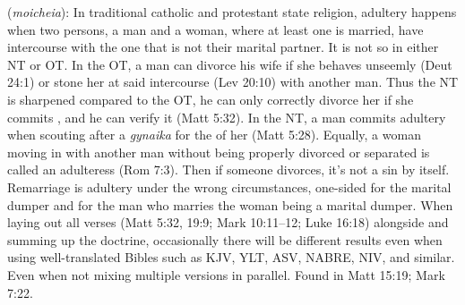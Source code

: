 \item[Adultery,]

(\textit{moicheia}):
In traditional catholic and protestant state religion, adultery happens when two persons, a man and a woman, where at least one is married, have intercourse with the one that is not their marital partner. It is not so in either NT or OT. In the OT, a man can divorce his wife if she behaves unseemly (Deut 24:1) or stone her at said intercourse (Lev 20:10) with another man. Thus the NT is sharpened compared to the OT, he can only correctly divorce her if she commits , and he can verify it (Matt 5:32). In the NT, a man commits adultery when scouting after a \emph{gynaika} for the  of her (Matt 5:28). Equally, a woman moving in with another man without being properly divorced or separated is called an adulteress (Rom 7:3). Then if someone divorces, it’s not a sin by itself. Remarriage is adultery under the wrong circumstances, one-sided for the marital dumper and for the man who marries the woman being a marital dumper. When laying out all verses (Matt 5:32, 19:9; Mark 10:11--12; Luke 16:18) alongside and summing up the doctrine, occasionally there will be different results even when using well-translated Bibles such as KJV, YLT, ASV, NABRE, NIV, and similar. Even when not mixing multiple versions in parallel.
Found in Matt 15:19; Mark 7:22.
